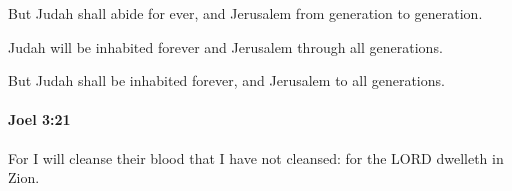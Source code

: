 			\begin{versebox}
					\item[BHS] 
					\item[LXX] 
					\item[ASV] But Judah shall abide for ever, and Jerusalem from generation to generation.
					\item[NIV] Judah will be inhabited forever and Jerusalem through all generations.
					\item[NRSV] But Judah shall be inhabited forever, and Jerusalem to all generations.
			\end{versebox}

		\paragraph{Joel 3:21} %
			\label{JOEL-3-21}

			For I will cleanse their blood that I have not cleansed: for the LORD dwelleth in Zion.

